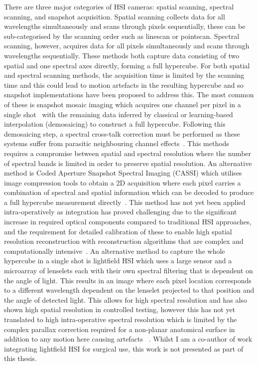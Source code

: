 There are three major categories of HSI cameras: spatial scanning, spectral scanning, and snapshot acquisition. Spatial scanning collects data for all wavelengths simultaneously and scans through pixels sequentially, these can be sub-categorised by the scanning order such as linescan or pointscan. Spectral scanning, however, acquires data for all pixels simultaneously and scans through wavelengths sequentially. These methods both capture data consisting of two spatial and one spectral axes directly, forming a full hypercube. For both spatial and spectral scanning methods, the acquisition time is limited by the scanning time and this could lead to motion artefacts in the resulting hypercube and so snapshot implementations have been proposed to address this. The most common of these is snapshot mosaic imaging which acquires one channel per pixel in a single shot~\citep{Geelen2014} with the remaining data inferred by classical or learning-based~\citep{Li2021} interpolation (demosaicing) to construct a full hypercube. Following this demosaicing step, a spectral cross-talk correction must be performed as these systems suffer from parasitic neighbouring channel effects~\citep{Pichette2017}. This methods requires a compromise between spatial and spectral resolution where the number of spectral bands is limited in order to preserve spatial resolution. An alternative method is Coded Aperture Snapshot Spectral Imaging (CASSI) which utilises image compression tools to obtain a 2D acquisition where each pixel carries a combination of spectral and spatial information which can be decoded to produce a full hypercube measurement directly~\citep{Song2022, Eldar2009}. This method has not yet been applied intra-operatively as integration has proved challenging due to the significant increase in required optical components compared to traditional HSI approaches, and the requirement for detailed calibration of these to enable high spatial resolution reconstruction with reconstruction algorithms that are complex and computationally intensive~\citep{Song2022}. An alternative method to capture the whole hypercube in a single shot is lightfield HSI which uses a large sensor and a microarray of lenselets each with their own spectral filtering that is dependent on the angle of light. This results in an image where each pixel location corresponds to a different wavelength dependent on the lenselet projected to that position and the angle of detected light. This allows for high spectral resolution and has also shown high spatial resolution in controlled testing, however this has not yet translated to high intra-operative spectral resolution which is limited by the complex parallax correction required for a non-planar anatomical surface in addition to any motion here causing artefacts~
\citep{MacCormac2023}. Whilst I am a co-author of work integrating lightfield HSI for surgical use, this work is not presented as part of this thesis. 

